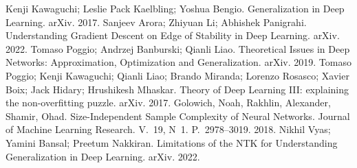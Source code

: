  Kenji Kawaguchi; Leslie Pack Kaelbling; Yoshua Bengio. Generalization in Deep Learning. arXiv. 2017.
 Sanjeev Arora; Zhiyuan Li; Abhishek Panigrahi. Understanding Gradient Descent on Edge of Stability in Deep Learning. arXiv. 2022.
 Tomaso Poggio; Andrzej Banburski; Qianli Liao. Theoretical Issues in Deep Networks: Approximation, Optimization and Generalization. arXiv. 2019.
 Tomaso Poggio; Kenji Kawaguchi; Qianli Liao; Brando Miranda; Lorenzo Rosasco; Xavier Boix; Jack Hidary; Hrushikesh Mhaskar. Theory of Deep Learning III: explaining the non-overfitting puzzle. arXiv. 2017.
 Golowich, Noah, Rakhlin, Alexander, Shamir, Ohad. Size-Independent Sample Complexity of Neural Networks. Journal of Machine Learning Research. V.~19, N~1. P.~2978--3019. 2018.
 Nikhil Vyas; Yamini Bansal; Preetum Nakkiran. Limitations of the NTK for Understanding Generalization in Deep Learning. arXiv. 2022.
